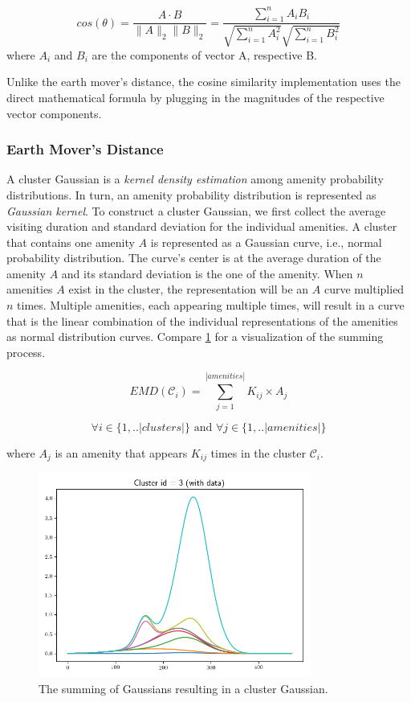 \begin{equation}
cos(\theta)=\frac{A\cdot B}{{\lVert}A{\rVert}       
	_2{\lVert}B{\rVert}_2}=\frac{\sum_{i=1}^n{A_iB_i}}{\sqrt{\sum_{i=1}^n{A_i^2}}\sqrt{\sum_{i=1}^n{B_i^2}}}
\end{equation}
where $A_i$ and $B_i$ are the components of vector A, respective B. 

Unlike the earth mover's distance, the cosine similarity implementation uses the direct mathematical formula by plugging in the magnitudes of the respective vector components.

\subsubsection{Earth Mover's Distance}
\label{realization:gaussians}

A cluster Gaussian is a \textit{kernel density estimation} among amenity probability distributions.
In turn, an amenity probability distribution is represented as \textit{Gaussian kernel}.
To construct a cluster Gaussian, we first collect the average visiting duration and standard deviation for the individual amenities.
A cluster that contains one amenity $A$ is represented as a Gaussian curve, i.e., normal probability distribution.
The curve's center is at the average duration of the amenity $A$ and its standard deviation is the one of the amenity.
When $n$ amenities $A$ exist in the cluster, the representation will be an $A$ curve multiplied $n$ times.
Multiple amenities, each appearing multiple times, will result in a curve that is the linear combination of the individual representations of the amenities as normal distribution curves.
Compare \ref{fig:gaussian} for a visualization of the summing process.

\begin{equation}
EMD(\mathcal{C}_i) = \sum_{j=1}^{|amenities|} K_{ij} \times A_j
\end{equation}

$$\forall i \in \{1,..|clusters|\} \text{ and } \forall j \in \{1,..|amenities|\}$$

where $A_j$ is an amenity that appears $K_{ij}$ times in the cluster $\mathcal{C}_i$.

\begin{figure}[!ht]
	\centering
	\includegraphics[width=0.8\textwidth]{graphics/emd_gaussian_addition3.png}
	\caption{The summing of Gaussians resulting in a cluster Gaussian.}
	\label{fig:gaussian}
\end{figure}

